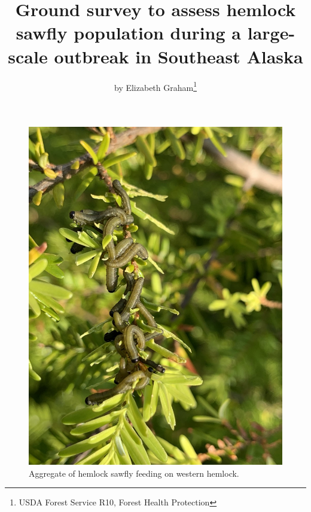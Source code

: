 ﻿\title{Ground survey to assess hemlock sawfly population during a large-scale outbreak in Southeast Alaska}

\subtitle{}

\author{by Elizabeth Graham\footnote{USDA Forest Service R10, Forest Health Protection}}

\maketitle

\begin{figure}[H]
\begin{center}
\includegraphics[width=\textwidth]{img/hemlock_sawfly_larvae.jpg}
\caption{Aggregate of hemlock sawfly feeding on western hemlock.}
\label{hemlock_sawfly_larvae}
\end{center}
\end{figure}

